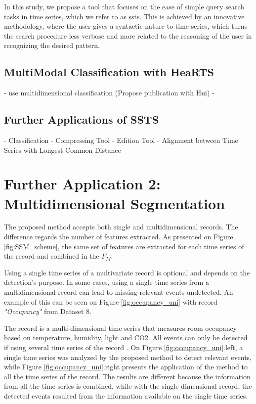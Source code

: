 In this study, we propose a tool that focuses on the ease of simple query search tasks in time series, which we refer to as \gls{ssts}. This is achieved by an innovative methodology, where the user gives a syntactic nature to time series, which turns the search procedure less verbose and more related to the reasoning of the user in recognizing the desired pattern.



\subsection{MultiModal Classification with HeaRTS}

- use multidimensional classification (Propose publication with Hui)
- 

\subsection{Further Applications of SSTS}

- Classification
- Compressing Tool
- Edition Tool
- Alignment between Time Series with Longest Common Distance

\section{Further Application 2: Multidimensional Segmentation}

The proposed method accepts both single and multidimensional records. The difference regards the number of features extracted. As presented on Figure \ref{fig:SSM_scheme}, the same set of features are extracted for each time series of the record and combined in the $F_M$. 
\par
Using a single time series of a multivariate record is optional and depends on the detection's purpose. In some cases, using a single time series from a multidimensional record can lead to missing relevant events undetected. An example of this can be seen on Figure \ref{fig:occupancy_uni} with record \textit{"Occupancy"} from Dataset 8. 
\par
The record is a multi-dimensional time series that measures room occupancy based on temperature, humidity, light and CO2. All events can only be detected if using several time series of the record \cite{cpd_alan}. On Figure \ref{fig:occupancy_uni}.left, a single time series was analyzed by the proposed method to detect relevant events, while Figure \ref{fig:occupancy_uni}.right presents the application of the method to all the time series of the record. The results are different because the information from all the time series is combined, while with the single dimensional record, the detected events resulted from the information available on the single time series.\\
